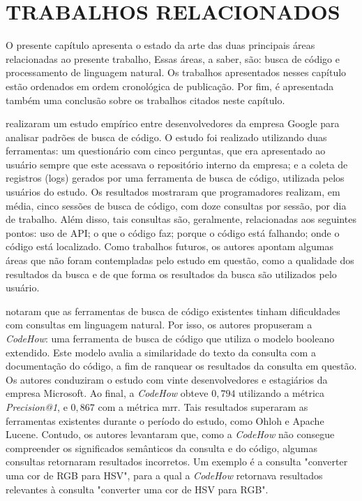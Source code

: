 \chapter{TRABALHOS RELACIONADOS}
\label{chp:relatedWorks}

O presente capítulo apresenta o estado da arte das duas principais áreas relacionadas ao presente trabalho, Essas áreas, a saber, são: busca de código e processamento de linguagem natural. Os trabalhos apresentados nesses capítulo estão ordenados em ordem cronológica de publicação. Por fim, é apresentada também uma conclusão sobre os trabalhos citados neste capítulo.

\textcite{Sadowski2015HowDS} realizaram um estudo empírico entre desenvolvedores da empresa Google para analisar padrões de busca de código. O estudo foi realizado utilizando duas ferramentas: um questionário com cinco perguntas, que era apresentado ao usuário sempre que este acessava o repositório interno da empresa; e a coleta de registros (logs) gerados por uma ferramenta de busca de código, utilizada pelos usuários do estudo. Os resultados mostraram que programadores realizam, em média, cinco sessões de busca de código, com doze consultas por sessão, por dia de trabalho. Além disso, tais consultas são, geralmente, relacionadas aos seguintes pontos: uso de API; o que o código faz; porque o código está falhando; onde o código está localizado. Como trabalhos futuros, os autores apontam algumas áreas que não foram contempladas pelo estudo em questão, como a qualidade dos resultados da busca e de que forma os resultados da busca são utilizados pelo usuário. 

\textcite{lv2015codehow} notaram que as ferramentas de busca de código existentes tinham dificuldades com consultas em linguagem natural. Por isso, os autores propuseram a \textit{CodeHow}: uma ferramenta de busca de código que utiliza o modelo booleano extendido. Este modelo avalia a similaridade do texto da consulta com a documentação do código, a fim de ranquear os resultados da consulta em questão. Os autores conduziram o estudo com vinte desenvolvedores e estagiários da empresa Microsoft. Ao final, a \emph{CodeHow} obteve $0,794$ utilizando a métrica \textit{Precision@1}, e $0,867$ com a métrica \gls{mrr}. Tais resultados superaram as ferramentas existentes durante o período do estudo, como Ohloh e Apache Lucene. Contudo, os autores levantaram que, como a \textit{CodeHow} não consegue compreender os significados semânticos da consulta e do código, algumas consultas retornaram resultados incorretos. Um exemplo é a consulta "converter uma cor de RGB para HSV", para a qual a \textit{CodeHow} retornava resultados relevantes à consulta "converter uma cor de HSV para RGB". 

